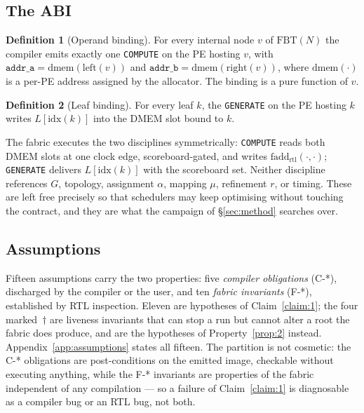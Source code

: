 \documentclass[journal,10pt]{IEEEtran}
\theoremstyle{plain}
\theoremstyle{definition}
\newtheorem{definition}{Definition}
\theoremstyle{remark}
\newcommand{\FBT}{\ensuremath{\mathrm{FBT}}}
\newcommand{\fadd}{\ensuremath{\mathrm{fadd}_{\mathrm{rtl}}}}
\newcommand{\asgn}{\ensuremath{\alpha}}
\newcommand{\map}{\ensuremath{\mu}}
\begin{document}
\subsection{The ABI}\label{sec:abi-def}

\begin{definition}[Operand binding]\label{def:opbind}
For every internal node $v$ of $\FBT(N)$ the compiler emits exactly one
\texttt{COMPUTE} on the PE hosting $v$, with
$\mathtt{addr\_a} = \mathrm{dmem}(\mathrm{left}(v))$ and
$\mathtt{addr\_b} = \mathrm{dmem}(\mathrm{right}(v))$, where
$\mathrm{dmem}(\cdot)$ is a per-PE address assigned by the allocator. The
binding is a pure function of $v$.
\end{definition}

\begin{definition}[Leaf binding]\label{def:leafbind}
For every leaf $k$, the \texttt{GENERATE} on the PE hosting $k$ writes
$L[\mathrm{idx}(k)]$ into the DMEM slot bound to $k$.
\end{definition}

The fabric executes the two disciplines symmetrically: \texttt{COMPUTE} reads
both DMEM slots at one clock edge, scoreboard-gated, and writes
$\fadd(\cdot,\cdot)$; \texttt{GENERATE} delivers $L[\mathrm{idx}(k)]$ with the
scoreboard set. Neither discipline references $G$, topology, assignment
$\asgn$, mapping $\map$, refinement $r$, or timing. These are left free
precisely so that schedulers may keep optimising without touching the
contract, and they are what the campaign of \S\ref{sec:method} searches over.

\subsection{Assumptions}\label{sec:abi-assumptions}

Fifteen assumptions carry the two properties: five \emph{compiler obligations}
(\textsf{C-*}), discharged by the compiler or the user, and ten \emph{fabric
invariants} (\textsf{F-*}), established by RTL inspection. Eleven are
hypotheses of Claim~\ref{claim:1}; the four marked~$\dagger$ are liveness
invariants that can stop a run but cannot alter a root the fabric does
produce, and are the hypotheses of Property~\ref{prop:2} instead.
Appendix~\ref{app:assumptions} states all fifteen. The partition is not
cosmetic: the \textsf{C-*} obligations are post-conditions on the emitted
image, checkable without executing anything, while the \textsf{F-*} invariants
are properties of the fabric independent of any compilation --- so a failure
of Claim~\ref{claim:1} is diagnosable as a compiler bug or an RTL bug, not
both.
\end{document}
